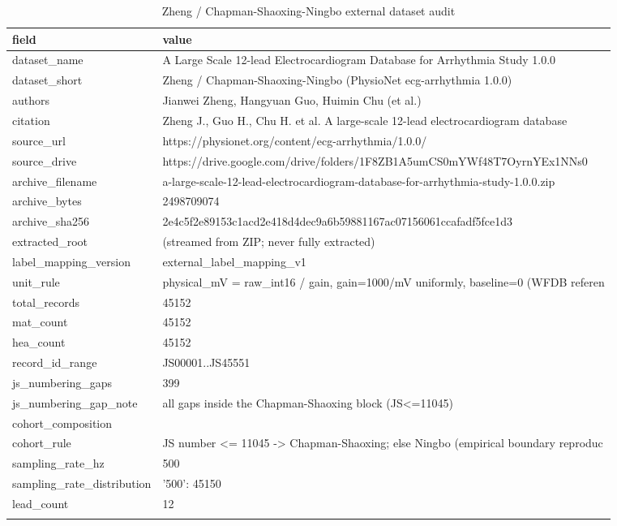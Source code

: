 \begin{table}[htbp]\centering\small
\caption{Zheng / Chapman-Shaoxing-Ningbo external dataset audit}\label{tab:extdataset}
\begin{tabular}{ll}
\hline
field & value \\
\hline
dataset_name & A Large Scale 12-lead Electrocardiogram Database for Arrhythmia Study 1.0.0 \\
dataset_short & Zheng / Chapman-Shaoxing-Ningbo (PhysioNet ecg-arrhythmia 1.0.0) \\
authors & Jianwei Zheng, Hangyuan Guo, Huimin Chu (et al.) \\
citation & Zheng J., Guo H., Chu H. et al. A large-scale 12-lead electrocardiogram database \\
source_url & https://physionet.org/content/ecg-arrhythmia/1.0.0/ \\
source_drive & https://drive.google.com/drive/folders/1F8ZB1A5umCS0mYWf48T7OyrnYEx1NNs0 \\
archive_filename & a-large-scale-12-lead-electrocardiogram-database-for-arrhythmia-study-1.0.0.zip \\
archive_bytes & 2498709074 \\
archive_sha256 & 2e4c5f2e89153c1acd2e418d4dec9a6b59881167ac07156061ccafadf5fce1d3 \\
extracted_root & (streamed from ZIP; never fully extracted) \\
label_mapping_version & external_label_mapping_v1 \\
unit_rule & physical_mV = raw_int16 / gain, gain=1000/mV uniformly, baseline=0 (WFDB referen \\
total_records & 45152 \\
mat_count & 45152 \\
hea_count & 45152 \\
record_id_range & JS00001..JS45551 \\
js_numbering_gaps & 399 \\
js_numbering_gap_note & all gaps inside the Chapman-Shaoxing block (JS<=11045) \\
cohort_composition & {"Chapman-Shaoxing (Shaoxing People's Hospital)": 10646, 'Ningbo (Ningbo First H \\
cohort_rule & JS number <= 11045 -> Chapman-Shaoxing; else Ningbo (empirical boundary reproduc \\
sampling_rate_hz & 500 \\
sampling_rate_distribution & {'500': 45150} \\
lead_count & 12 \\
}
\end{tabular}
\end{table}
